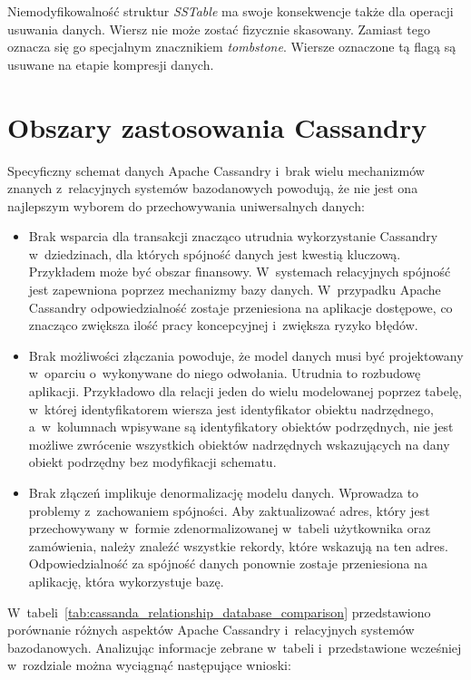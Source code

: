 Niemodyfikowalność struktur \emph{SSTable} ma swoje konsekwencje także dla operacji usuwania danych. Wiersz nie może zostać fizycznie skasowany. Zamiast tego oznacza się go specjalnym znacznikiem \emph{tombstone}. Wiersze oznaczone tą flagą są usuwane na etapie kompresji danych.

\section{Obszary zastosowania Cassandry}
\label{sec:cassandra_usage_areas}

Specyficzny schemat danych Apache Cassandry i~brak wielu mechanizmów znanych z~relacyjnych systemów bazodanowych powodują, że nie jest ona najlepszym wyborem do przechowywania uniwersalnych danych:

\begin{itemize}
	\item Brak wsparcia dla transakcji znacząco utrudnia wykorzystanie Cassandry w~dziedzinach, dla których spójność danych jest kwestią kluczową. Przykładem może być obszar finansowy. W~systemach relacyjnych spójność jest zapewniona poprzez mechanizmy bazy danych. W~przypadku Apache Cassandry odpowiedzialność zostaje przeniesiona na aplikacje dostępowe, co znacząco zwiększa ilość pracy koncepcyjnej i~zwiększa ryzyko błędów.
	\item Brak możliwości złączania powoduje, że model danych musi być projektowany w~oparciu o~wykonywane do niego odwołania. Utrudnia to rozbudowę aplikacji. Przykładowo dla relacji jeden do wielu modelowanej poprzez tabelę, w~której identyfikatorem wiersza jest identyfikator obiektu nadrzędnego, a~w~kolumnach wpisywane są identyfikatory obiektów podrzędnych, nie jest możliwe zwrócenie wszystkich obiektów nadrzędnych wskazujących na dany obiekt podrzędny bez modyfikacji schematu.
	\item Brak złączeń implikuje denormalizację modelu danych. Wprowadza to problemy z~zachowaniem spójności. Aby zaktualizować adres, który jest przechowywany w~formie zdenormalizowanej w~tabeli użytkownika oraz zamówienia, należy znaleźć wszystkie rekordy, które wskazują na ten adres. Odpowiedzialność za spójność danych ponownie zostaje przeniesiona na aplikację, która wykorzystuje bazę.
\end{itemize}

W~tabeli~\ref{tab:cassanda_relationship_database_comparison} przedstawiono porównanie różnych aspektów Apache Cassandry i~relacyjnych systemów bazodanowych. Analizując informacje zebrane w~tabeli i~przedstawione wcześniej w~rozdziale można wyciągnąć następujące wnioski:

